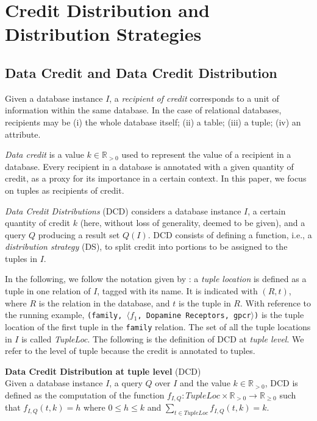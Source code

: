\section{Credit Distribution and Distribution Strategies}
\label{section:distribution_strategies}

\subsection{Data Credit and Data Credit Distribution}
Given a database instance $I$, a \emph{recipient of credit} corresponds to a unit of information within the same database. In the case of relational databases, recipients may be (i) the whole database itself; (ii) a table; (iii) a tuple; (iv) an attribute.

\emph{Data credit} is a value $k \in \mathbb{R}_{>0}$ used to represent the value of a recipient in a database. 
Every recipient in a database is annotated with a given quantity of credit, as a proxy for its importance in a certain context. In this paper, we focus on tuples as recipients of credit. 

\emph{Data Credit Distributions} (DCD) considers a database instance $I$, a certain quantity of credit $k$ (here, without loss of generality, deemed to be given), and a query $Q$ producing a result set $Q(I)$.  
DCD consists of defining a function, i.e., a \emph{distribution strategy} (DS), to split credit into portions to be assigned to the tuples in $I$.

In the following, we follow the notation given by \cite{CheneyProvSurvey}: a \emph{tuple location} is defined as a tuple in one relation of $I$, tagged with its name. It is indicated with $(R, t)$, where $R$ is the relation in the database, and $t$ is the tuple in $R$. With reference to the running example, \texttt{(family, $\langle f_1$, Dopamine Receptors, gpcr$\rangle$)} is the tuple location of the first tuple in the \texttt{family} relation.  The set of all the tuple locations in $I$ is called \emph{TupleLoc}.
The following is the definition of DCD at \emph{tuple level}. We refer to the level of tuple because the credit is annotated to tuples.

\begin{definition}
    \textbf{Data Credit Distribution at tuple level} (DCD)~\citep{dosso2020data}
    \label{def:CDT}\\
    Given a database instance $I$, a query $Q$ over $I$ and the value $k \in \mathbb{R}_{>0}$, DCD is defined as the computation of the function $f_{I, Q} : TupleLoc \times \mathbb{R}_{> 0} \rightarrow \mathbb{R}_{\geq0}$ such that $f_{I,Q}(t, k)=h$ where $0 \leq h \leq k$ and $\sum_{t \in TupleLoc}f_{I, Q}(t, k) = k$.
\end{definition}

